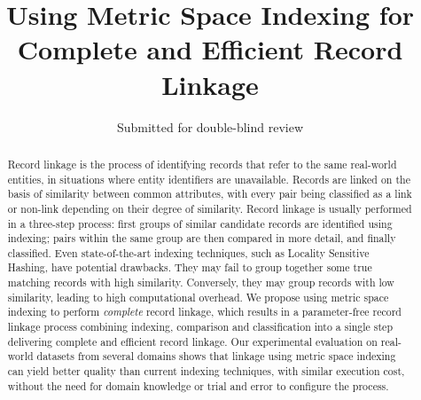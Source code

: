\documentclass{llncs}
\begin{document}
       
\title{Using Metric Space Indexing for Complete and Efficient Record Linkage}


\author{Submitted for double-blind review}

\maketitle

\begin{abstract}

Record linkage is the process of identifying records that refer to the
same real-world entities, in situations where entity identifiers are
unavailable. Records are linked on the basis of similarity between
common attributes, with every pair being classified as a link or
non-link depending on their degree of similarity. Record linkage is
usually performed in a three-step process: first groups of similar
candidate records are identified using indexing; pairs within the same
group are then compared in more detail, and finally classified.
%
Even state-of-the-art indexing techniques, such as Locality Sensitive
Hashing, have potential drawbacks. They may fail to group together some
true matching records with high similarity. Conversely, they may group
records with low similarity, leading to high computational overhead.
%
We propose using metric space indexing to perform \emph{complete} record
linkage, which results in a parameter-free record linkage process
combining indexing, comparison and classification into a single step
delivering complete and efficient record linkage. Our experimental
evaluation on real-world datasets from several domains shows that
linkage using metric space indexing can yield better quality than
current indexing techniques, with similar execution cost, without the
need for domain knowledge or trial and error to configure the process.

\end{abstract}
\end{document}
